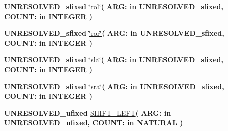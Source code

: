\begin{DoxyCompactItemize}
\item 
{\bfseries {\bfseries \textcolor{vhdlchar}{U\+N\+R\+E\+S\+O\+L\+V\+E\+D\+\_\+sfixed}\textcolor{vhdlchar}{ }}} \hyperlink{class__fixed__pkg_a2f2ff884511f426e12ca1e5401086cb0}{\char`\"{}rol\char`\"{}}{\bfseries  ( }{\bfseries \textcolor{vhdlchar}{A\+R\+G\+: }\textcolor{stringliteral}{in }\textcolor{vhdlchar}{U\+N\+R\+E\+S\+O\+L\+V\+E\+D\+\_\+sfixed}}{\bfseries  , \textcolor{vhdlchar}{C\+O\+U\+N\+T\+: }\textcolor{stringliteral}{in }{\bfseries \textcolor{comment}{I\+N\+T\+E\+G\+E\+R}\textcolor{vhdlchar}{ }}}{\bfseries  )} 
\item 
{\bfseries {\bfseries \textcolor{vhdlchar}{U\+N\+R\+E\+S\+O\+L\+V\+E\+D\+\_\+sfixed}\textcolor{vhdlchar}{ }}} \hyperlink{class__fixed__pkg_ab04d1270cdd250cd23cc132d3005bd68}{\char`\"{}ror\char`\"{}}{\bfseries  ( }{\bfseries \textcolor{vhdlchar}{A\+R\+G\+: }\textcolor{stringliteral}{in }\textcolor{vhdlchar}{U\+N\+R\+E\+S\+O\+L\+V\+E\+D\+\_\+sfixed}}{\bfseries  , \textcolor{vhdlchar}{C\+O\+U\+N\+T\+: }\textcolor{stringliteral}{in }{\bfseries \textcolor{comment}{I\+N\+T\+E\+G\+E\+R}\textcolor{vhdlchar}{ }}}{\bfseries  )} 
\item 
{\bfseries {\bfseries \textcolor{vhdlchar}{U\+N\+R\+E\+S\+O\+L\+V\+E\+D\+\_\+sfixed}\textcolor{vhdlchar}{ }}} \hyperlink{class__fixed__pkg_a6625058c74350c50e27506b5711606d1}{\char`\"{}sla\char`\"{}}{\bfseries  ( }{\bfseries \textcolor{vhdlchar}{A\+R\+G\+: }\textcolor{stringliteral}{in }\textcolor{vhdlchar}{U\+N\+R\+E\+S\+O\+L\+V\+E\+D\+\_\+sfixed}}{\bfseries  , \textcolor{vhdlchar}{C\+O\+U\+N\+T\+: }\textcolor{stringliteral}{in }{\bfseries \textcolor{comment}{I\+N\+T\+E\+G\+E\+R}\textcolor{vhdlchar}{ }}}{\bfseries  )} 
\item 
{\bfseries {\bfseries \textcolor{vhdlchar}{U\+N\+R\+E\+S\+O\+L\+V\+E\+D\+\_\+sfixed}\textcolor{vhdlchar}{ }}} \hyperlink{class__fixed__pkg_a5f4c31f8c3d28ee7eed2d15f6dcd2840}{\char`\"{}sra\char`\"{}}{\bfseries  ( }{\bfseries \textcolor{vhdlchar}{A\+R\+G\+: }\textcolor{stringliteral}{in }\textcolor{vhdlchar}{U\+N\+R\+E\+S\+O\+L\+V\+E\+D\+\_\+sfixed}}{\bfseries  , \textcolor{vhdlchar}{C\+O\+U\+N\+T\+: }\textcolor{stringliteral}{in }{\bfseries \textcolor{comment}{I\+N\+T\+E\+G\+E\+R}\textcolor{vhdlchar}{ }}}{\bfseries  )} 
\item 
{\bfseries {\bfseries \textcolor{vhdlchar}{U\+N\+R\+E\+S\+O\+L\+V\+E\+D\+\_\+ufixed}\textcolor{vhdlchar}{ }}} \hyperlink{class__fixed__pkg_a2de27eedcaa3742451c07ee985b0686c}{S\+H\+I\+F\+T\+\_\+\+L\+E\+F\+T}{\bfseries  ( }{\bfseries \textcolor{vhdlchar}{A\+R\+G\+: }\textcolor{stringliteral}{in }\textcolor{vhdlchar}{U\+N\+R\+E\+S\+O\+L\+V\+E\+D\+\_\+ufixed}}{\bfseries  , \textcolor{vhdlchar}{C\+O\+U\+N\+T\+: }\textcolor{stringliteral}{in }{\bfseries \textcolor{comment}{N\+A\+T\+U\+R\+A\+L}\textcolor{vhdlchar}{ }}}{\bfseries  )} 

\end{DoxyCompactItemize}
